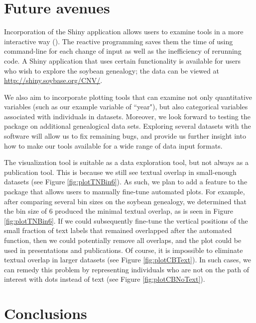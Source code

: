 \documentclass[article,shortnames]{jss}
\begin{document}
\section{Future avenues}

Incorporation of the Shiny application allows users to examine  tools in a more interactive way (\citealt{shiny}). The reactive programming saves them the time of using command-line for each change of input as well as the inefficiency of rerunning code. A Shiny application that uses certain  functionality is available for users who wish to explore the soybean genealogy; the data can be viewed at \url{http://shiny.soybase.org/CNV/}.

We also aim to incorporate plotting tools that can examine not only quantitative variables (such as our example variable of ``year"), but also categorical variables associated with individuals in datasets. Moreover, we look forward to testing the  package on additional genealogical data sets. Exploring several datasets with the software will allow us to fix remaining bugs, and provide us further insight into how to make our tools available for a wide range of data input formats.

The  visualization tool  is suitable as a data exploration tool, but not always as a publication tool. This is because we still see textual overlap in small-enough datasets (see Figure \ref{fig:plotTNBin6}). As such, we plan to add a feature to the package that allows users to manually fine-tune automated plots. For example, after comparing several bin sizes on the soybean genealogy, we determined that the bin size of 6 produced the minimal textual overlap, as is seen in Figure \ref{fig:plotTNBin6}. If we could subsequently fine-tune the vertical positions of the small fraction of text labels that remained overlapped after the automated  function, then we could potentially remove all overlaps, and the plot could be used in presentations and publications. Of course, it is impossible to eliminate textual overlap in larger datasets (see Figure \ref{fig:plotCBText}). In such cases, we can remedy this problem by representing individuals who are not on the path of interest with dots instead of text (see Figure \ref{fig:plotCBNoText}).

\section{Conclusions}
\end{document}
